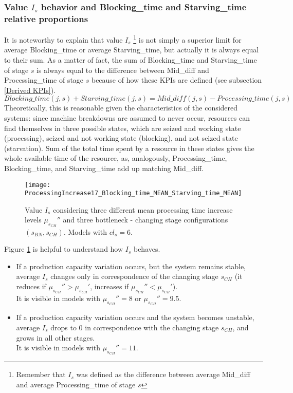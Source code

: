 \subsubsection{Value $I_s$ behavior and Blocking\_time and Starving\_time relative proportions}
It is noteworthy to explain that value $I_s$ \footnote{Remember that $I_s$ was defined as the difference between average Mid\_diff and average Processing\_time of stage $s$} is not simply a superior limit for average Blocking\_time or average Starving\_time, but actually it is always equal to their sum. As a matter of fact, the sum of Blocking\_time and Starving\_time of stage $s$ is always equal to the difference between Mid\_diff and Processing\_time of stage $s$ because of how these KPIs are defined (see subsection \ref{Derived KPIs}). 
\[Blocking\_time(j,s)+Starving\_time(j,s)=Mid\_diff(j,s)-Processing\_time(j,s)\]
Theoretically, this is reasonable given the characteristics of the considered systems: since machine breakdowns are assumed to never occur, resources can find themselves in three possible states, which are seized and working state (processing), seized and not working state (blocking), and not seized state (starvation). Sum of the total time spent by a resource in these states gives the whole available time of the resource, as, analogously, Processing\_time, Blocking\_time, and Starving\_time add up matching Mid\_diff. 
\begin{figure}[h] 
\centering
\texttt{[image: ProcessingIncrease17\_Blocking\_time\_MEAN\_Starving\_time\_MEAN]}
\caption[Value $I_s$ behavior with different processing time increase levels]{Value $I_s$ considering three different mean processing time increase levels $\mu_{s_{CH}}''$ and three bottleneck - changing stage configurations $(s_{BN},s_{CH})$. Models with $cl_s=6$.}
\label{fig:Value $I_s$ behavior with different processing time increase levels}
\end{figure}
Figure \ref{fig:Value $I_s$ behavior with different processing time increase levels} is helpful to understand how $I_s$ behaves.
\begin{itemize}
\item If a production capacity variation occurs, but the system remains stable, average $I_s$ changes only in correspondence of the changing stage $s_{CH}$ (it reduces if $\mu_{s_{CH}}''>\mu_{s_{CH}}'$, increases if $\mu_{s_{CH}}''<\mu_{s_{CH}}'$). \\It is visible in models with $\mu_{s_{CH}}''=8$ or $\mu_{s_{CH}}''=9.5$.
\item If a production capacity variation occurs and the system becomes unstable, average $I_s$ drops to $0$ in correspondence with the changing stage $s_{CH}$, and grows in all other stages. \\It is visible in models with $\mu_{s_{CH}}''=11$.
\end{itemize}
